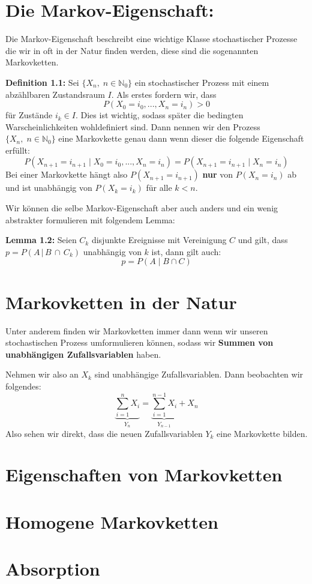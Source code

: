 \documentclass[a4paper]{article}
\begin{document}
	\section{Die Markov-Eigenschaft:}
	Die Markov-Eigenschaft beschreibt eine wichtige Klasse stochastischer Prozesse
	die wir in oft in der Natur finden werden, diese sind die sogenannten Markovketten.

	\vspace{\baselineskip}
	\textbf{Definition 1.1:}
	Sei $\{
		X_n, \; n \in \mathbb{N}_0
	\} $ ein stochastischer Prozess mit einem abzählbaren Zustandsraum $I$.
	Als erstes fordern wir, dass
	\[
		P(X_0 = i_0, ..., X_n = i_n) > 0
	\]
	für Zustände $i_k \in I$. Dies ist wichtig, sodass später die bedingten Warscheinlichkeiten
	wohldefiniert sind. Dann nennen wir den Prozess $\{
		X_n, \; n \in \mathbb{N}_0 
	\} $ eine Markovkette genau dann wenn dieser die folgende Eigenschaft erfüllt:
	\[
		P(X_{n+1} = i_{n+1} \; | \; X_0 = i_0, ..., X_n = i_n)
		= P(X_{n+1} = i_{n+1} \; | \; X_n = i_n)
	\] 
	Bei einer Markovkette hängt also $P(X_{n+1} = i_{n+1})$ \textbf{nur} von $P(X_{n} = i_{n})$ ab
	und ist unabhängig von $P(X_k = i_k)$ für alle $k < n$.

	\vspace{\baselineskip}
	Wir können die selbe Markov-Eigenschaft aber auch anders und ein wenig abstrakter 
	formulieren mit folgendem Lemma:

	\textbf{Lemma 1.2:} 
	Seien $C_k$ disjunkte Ereignisse mit Vereinigung $C$ und gilt, dass
	$p = P(A \, | \, B \, \cap \, C_k)$ unabhängig von $k$ ist, dann gilt auch:
	\[
		p = P(A \; | \; B \cap C)
	\] 
	\section{Markovketten in der Natur}
	Unter anderem finden wir Markovketten immer dann wenn wir unseren stochastischen Prozess
	umformulieren können, sodass wir \textbf{Summen von unabhängigen Zufallsvariablen} haben.

	\vspace{\baselineskip}
	Nehmen wir also an $X_k$ sind unabhängige Zufallsvariablen. Dann beobachten wir folgendes:
	\[
		\underbrace{\sum_{i=1}^{n} X_i}_{Y_n}
		= \underbrace{\sum_{i=1}^{n-1} X_i}_{Y_{n-1}} + X_n
	\]
	Also sehen wir direkt, dass die neuen Zufallsvariablen $Y_k$ eine Markovkette bilden.
	\section{Eigenschaften von Markovketten}
	\section{Homogene Markovketten}
	\section{Absorption}
	
\end{document}
